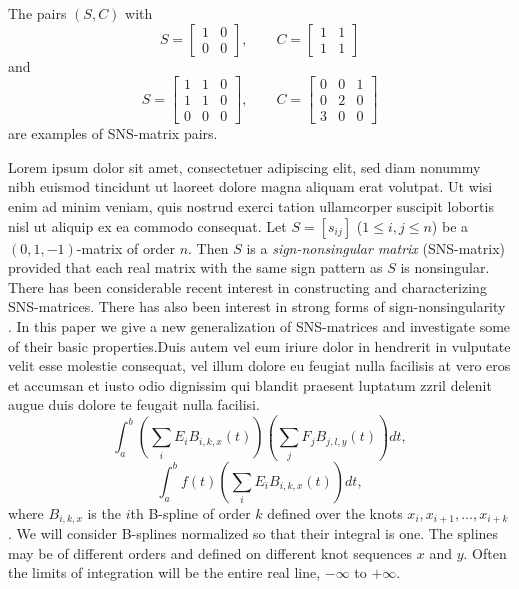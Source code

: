 \documentclass[oldfontcommands,6x9]{pupbook}
\begin{document}
The pairs $(S,C)$ with
\[S=\left[\begin{array}{cc}1&0\\0&0\end{array}\right],\qquad 
C=\left[\begin{array}{cc}1&1\\1&1\end{array}\right]\] and 
\[S=\left[\begin{array}{ccc}1&1&0\\1&1&0\\0&0&0\end{array}\right],\qquad 
C=\left[\begin{array}{ccc}0&0&1\\0&2&0\\
3&0&0\end{array}\right]\] are examples of SNS-matrix pairs.

Lorem ipsum dolor sit amet, consectetuer adipiscing elit, sed diam
nonummy nibh euismod tincidunt ut laoreet dolore magna aliquam erat
volutpat. Ut wisi enim ad minim veniam, quis nostrud exerci tation
ullamcorper suscipit lobortis nisl ut aliquip ex ea commodo consequat.
Let $S=[s_{ij}]$ ($1\leq i,j\leq n$) be a $(0,1,-1)$-matrix
of order $n$. Then $S$ is a {\em sign-nonsingular matrix}
(SNS-matrix) provided that each real matrix with the same
sign pattern as $S$ is nonsingular. There has been
considerable recent interest in constructing and
characterizing SNS-matrices. There
has also been interest in strong forms of
sign-nonsingularity . In this paper we give a new
generalization of SNS-matrices and investigate some of
their basic properties.Duis autem vel eum iriure dolor in hendrerit in vulputate velit esse
molestie consequat, vel illum dolore eu feugiat nulla facilisis at vero
eros et accumsan et iusto odio dignissim qui blandit praesent luptatum
zzril delenit augue duis dolore te feugait nulla facilisi. 
\begin{equation}
\int_a^b \left( \sum_i E_i B_{i,k,x}(t) \right)
         \left( \sum_j F_j B_{j,l,y}(t) \right) dt,\label{problem}
\end{equation}
\begin{equation}
\int_a^b f(t) \left( \sum_i E_i B_{i,k,x}(t) \right) dt,\label{problem2}
\end{equation}
where $B_{i,k,x}$ is the $i$th B-spline of order $k$ defined over the
knots $x_i, x_{i+1}, \ldots, x_{i+k}$.
We will consider B-splines normalized so that their integral is one.
The splines may be of different orders and
defined on different knot sequences $x$ and $y$.
Often the limits of integration will be the entire real line, $-\infty$
to $+\infty$.
\end{document}

